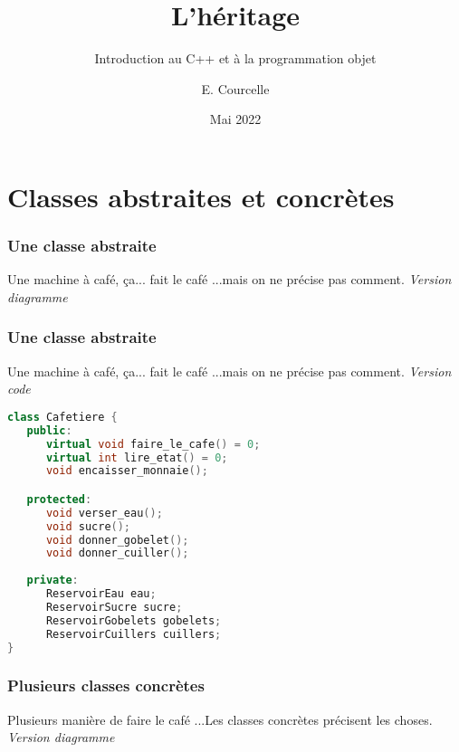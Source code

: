 \documentclass{beamer}
\title{L'héritage}
\subtitle{Introduction au C++ et à la programmation objet}
\author{E. Courcelle}\institute{CALMIP, URA 3669}
\date{Mai 2022}
\begin{document}
\begin{frame}
\titlepage
\end{frame}

\begin{frame}
\tableofcontents
\end{frame}

\section{Classes abstraites et concrètes}

\begin{frame}[fragile=singleslide,shrink=20]
\frametitle {Une classe abstraite}

\begin{block}{Une machine à café, ça... fait le café}
...mais on ne précise pas comment. \em{Version diagramme}
\end{block}

\begin{centering}%
%
\par%
\end{centering}%
\end{frame}

\begin{frame}[fragile=singleslide,shrink=20]
\frametitle {Une classe abstraite}

\begin{block}{Une machine à café, ça... fait le café}
...mais on ne précise pas comment. \em{Version code}
\end{block}
\begin{lstlisting}[language=c++]
class Cafetiere {
   public:
      virtual void faire_le_cafe() = 0;
      virtual int lire_etat() = 0;
      void encaisser_monnaie();

   protected:
      void verser_eau();
      void sucre();
      void donner_gobelet();
      void donner_cuiller();
      
   private:
      ReservoirEau eau;
      ReservoirSucre sucre;
      ReservoirGobelets gobelets;
      ReservoirCuillers cuillers;
}
\end{lstlisting}
\end{frame}

\begin{frame}[fragile=singleslide,shrink=20]
\frametitle {Plusieurs classes concrètes}

\begin{block}{Plusieurs manière de faire le café}
...Les classes concrètes précisent les choses. \em{Version diagramme}
\end{block}

\begin{centering}%
%
\par%
\end{centering}%
\end{frame}
\end{document}

